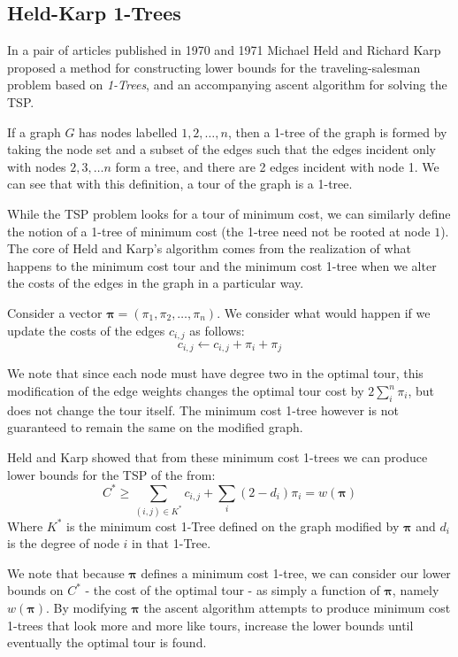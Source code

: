 \documentclass[11pt]{article}
\newcommand{\ve}[1]{\boldsymbol{#1}}
\begin{document}
	\subsection{Held-Karp 1-Trees}
	
	In a pair of articles published in 1970 and 1971 \cite{OneTree70,OneTree71} Michael Held and Richard Karp proposed a method for constructing lower bounds for the traveling-salesman problem based on \emph{1-Trees}, and an accompanying ascent algorithm for solving the TSP.
	
	If a graph $G$ has nodes labelled $1, 2, \dots, n$, then a 1-tree of the graph is formed by taking the node set and a subset of the edges such that the edges incident only with nodes $2, 3, \dots n$ form a tree, and there are 2 edges incident with node 1. We can see that with this definition, a tour of the graph is  a 1-tree.
	
	While the TSP problem looks for a tour of minimum cost, we can similarly define the notion of a 1-tree of minimum cost (the 1-tree need not be rooted at node $1$). The core of Held and Karp's algorithm comes from the realization of what happens to the minimum cost tour and the minimum cost 1-tree when we alter the costs of the edges in the graph in a particular way.
	
	Consider a vector $\ve{\pi} = (\pi_1, \pi_2, \dots, \pi_n)$. We consider what would happen if we update the costs of the edges $c_{i,j}$ as follows:
	$$ c_{i,j} \leftarrow c_{i,j} + \pi_i + \pi_j $$
	
	We note that since each node must have degree two in the optimal tour, this modification of the edge weights changes the optimal tour cost by $2 \sum\limits_i^n \pi_i$, but does not change the tour itself. The minimum cost 1-tree however is not guaranteed to remain the same on the modified graph.
	
	Held and Karp showed that from these minimum cost 1-trees we can produce lower bounds for the TSP of the from:
	\[ C^* \geq \sum\limits_{(i,j) \in K^*} c_{i,j} + \sum\limits_i (2 - d_i)\pi_i = w(\ve{\pi}) \]
	Where $K^*$ is the minimum cost 1-Tree defined on the graph modified by $\ve{\pi}$ and $d_i$ is the degree of node $i$ in that 1-Tree. 
	
	We note that because $\ve{\pi}$ defines a minimum cost 1-tree, we can consider our lower bounds on $C^*$ - the cost of the optimal tour - as simply a function of $\ve{\pi}$, namely $w(\ve{\pi})$. By modifying $\ve{\pi}$ the ascent algorithm attempts to produce minimum cost 1-trees that look more and more like tours, increase the lower bounds until eventually the optimal tour is found.
	
\end{document}
